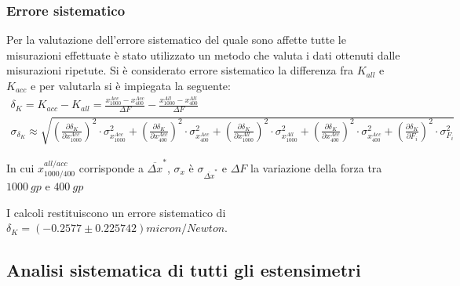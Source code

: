 \documentclass[a4paper,11pt,oneside]{article}
\begin{document}
\subsubsection{Errore sistematico}
Per la valutazione dell'errore sistematico del quale sono affette tutte le misurazioni effettuate è stato utilizzato un metodo che valuta i dati ottenuti dalle misurazioni ripetute. Si è considerato errore sistematico la differenza fra $K_{all}$ e $K_{acc}$ e per valutarla si è impiegata la seguente:
\begin{gather*}%
    
    \delta_{K} = K_{acc}- K_{all}=\frac{x^{Acc}_{1000}-x^{Acc}_{400}}{\Delta F}-\frac{x^{All}_{1000}-x^{All}_{400}}{\Delta F} \\

    \sigma_{\delta_K}\approx \sqrt{
\left ( \frac{\partial \delta_K }{\partial x^{Acc}_{1000}} \right )^2\cdot  \sigma_{x^{Acc}_{1000}} ^2+
\left ( \frac{\partial \delta_K}{\partial x^{Acc}_{400}} \right )^2\cdot  \sigma_{x^{Acc}_{400}} ^2+
\left ( \frac{\partial \delta_K }{\partial x^{All}_{1000}} \right )^2\cdot  \sigma_{x^{All}_{1000}} ^2+
\left ( \frac{\partial \delta_K }{\partial x^{Acc}_{400}} \right )^2\cdot  \sigma_{x^{Acc}_{400}} ^2+
\left ( \frac{\partial \delta_K}{\partial F_i} \right )^2\cdot  \sigma_{F_i} ^2}
\end{gather*}

In cui $x_{1000 / 400}^{all / acc}$ corrisponde a $\overline{\Delta x}^\ast$, $\sigma_{x}$ è $\sigma_{\overline{\Delta x}^\ast}$ e $\Delta F$ la variazione della forza tra $\SI{1000}{gp}$ e $\SI{400}{gp}$

I calcoli restituiscono un errore sistematico di $\delta_{K} = (-0.2577 \pm 0.225742) micron/Newton$. 





\subsection{Analisi sistematica di tutti gli estensimetri}
\end{document}
